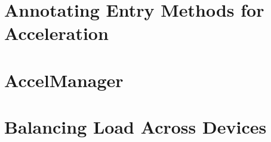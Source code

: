 \section{Annotating Entry Methods for Acceleration}
\subsection{}
\subsection{}
\subsection{}

\section{AccelManager}

\section{Balancing Load Across Devices}

